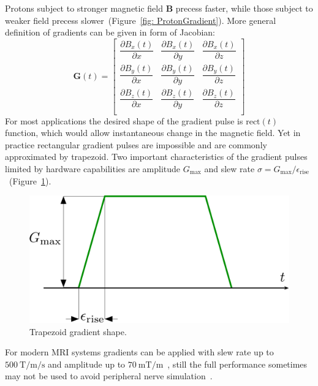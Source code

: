  Protons subject to stronger magnetic field $\mathbf{B}$ precess faster, while those subject to weaker field precess slower~(Figure~\ref{fig: ProtonGradient}). 
 More general definition of gradients can be given in form of Jacobian:
\begin{equation}\label{eq: Gradients}
	\mathbf{G}(t) = 
	\begin{bmatrix}
    \dfrac{\partial B_x(t)}{\partial x} & \dfrac{\partial B_x(t)}{\partial y} & \dfrac{\partial B_x(t)}{\partial z}\\[8pt]
    \dfrac{\partial B_y(t)}{\partial x} & \dfrac{\partial B_y(t)}{\partial y} & \dfrac{\partial B_y(t)}{\partial z}\\[8pt]
    \dfrac{\partial B_z(t)}{\partial x} & \dfrac{\partial B_z(t)}{\partial y} & \dfrac{\partial B_z(t)}{\partial z}\\
	\end{bmatrix}
\end{equation}
For most applications the desired shape of the gradient pulse is $\mathrm{rect}(t)$ function, which would allow instantaneous change in the magnetic field. 
Yet in practice rectangular gradient pulses are impossible and are commonly approximated by trapezoid. 
Two important characteristics of the gradient pulses limited by hardware capabilities are amplitude $G_{\mathrm{max}}$ and slew rate $\sigma = G_{\mathrm{max}} / \epsilon_{\mathrm{rise}}$ ~(Figure~\ref{fig: TrapGrad}).
\begin{figure}[!htb]
\vspace{+0.2cm}
\centering
\includegraphics[scale=.48]{Figures/Trapezoid.pdf}
\caption[Trapezoid gradient shape]{Trapezoid gradient shape.}
\label{fig: TrapGrad}
\end{figure}
For modern MRI systems gradients can be applied with slew rate up to $\SI{500}{\tesla / \meter / \second}$ and amplitude up to $\SI{70}{\milli\tesla / \meter}$~\cite{Tan:2020ht}, still the full performance sometimes may not be used to avoid peripheral nerve simulation~\cite{Ham:1997is}. 
